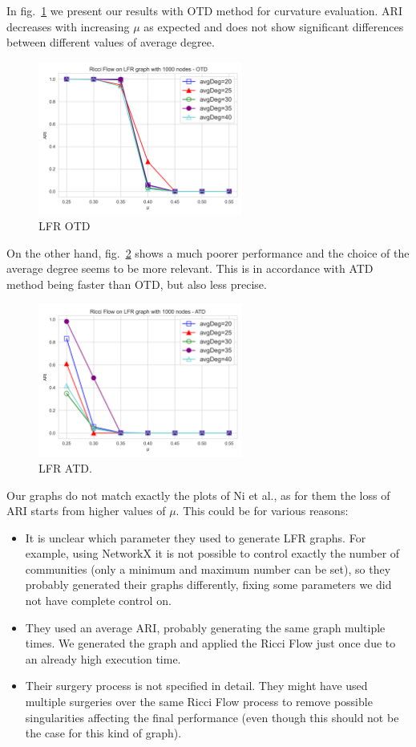 In fig.~\ref{fig:LFR_OTD} we present our results with OTD method for curvature evaluation. ARI decreases with increasing $\mu$ as expected and does not show significant differences between different values of average degree.
\begin{figure}
    \centering
    \includegraphics[width=0.6\textwidth]{../tests/LFRResults/LFR_OTD.png}
    \caption{LFR OTD}
    \label{fig:LFR_OTD}
\end{figure}

On the other hand, fig.~\ref{fig:LFR_ATD} shows a much poorer performance and the choice of the average degree seems to be more relevant. This is in accordance with ATD method being faster than OTD, but also less precise.
\begin{figure}
    \centering
    \includegraphics[width=0.6\textwidth]{../tests/LFRResults/LFR_ATD.png}
    \caption{LFR ATD.}
    \label{fig:LFR_ATD}
\end{figure}

Our graphs do not match exactly the plots of Ni et al., as for them the loss of ARI starts from higher values of $\mu$. This could be for various reasons:
\begin{itemize}
    \item It is unclear which parameter they used to generate LFR graphs. For example, using NetworkX it is not possible to control exactly the number of communities (only a minimum and maximum number can be set), so they probably generated their graphs differently, fixing some parameters we did not have complete control on.
    \item They used an average ARI, probably generating the same graph multiple times. We generated the graph and applied the Ricci Flow just once due to an already high execution time.
    \item Their surgery process is not specified in detail. They might have used multiple surgeries over the same Ricci Flow process to remove possible singularities affecting the final performance (even though this should not be the case for this kind of graph).
\end{itemize}